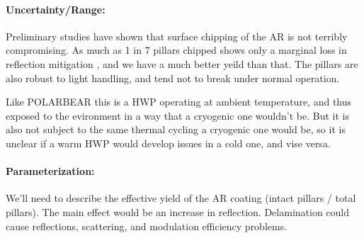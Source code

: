 \paragraph{Uncertainty/Range:}


Preliminary studies have shown that surface chipping of the AR is not terribly compromising. As much as 1 in 7 pillars chipped shows only a marginal loss in reflection mitigation \cite{SiAR_1}, and we have a much better yeild than that. The pillars are also robust to light handling, and tend not to break under normal operation.

Like POLARBEAR this is a HWP operating at ambient temperature, and thus exposed to the evironment in a way that a cryogenic one wouldn't be. But it is also not subject to the same thermal cycling a cryogenic one would be, so it is unclear if a warm HWP would develop issues in a cold one, and vise versa.

\paragraph{Parameterization:}
We'll need to describe the effective yield of the AR coating (intact pillars / total pillars). The main effect would be an increase in reflection. Delamination could cause reflections, scattering, and modulation efficiency problems.  

